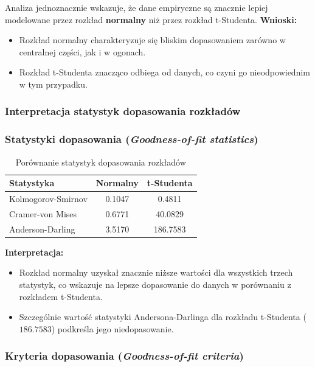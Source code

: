\documentclass[a4paper,11pt]{article}
\begin{document}
Analiza jednoznacznie wskazuje, że dane empiryczne są znacznie lepiej modelowane przez rozkład \textbf{normalny} niż przez rozkład t-Studenta.  
\textbf{Wnioski:}
\begin{itemize}
    \item Rozkład normalny charakteryzuje się bliskim dopasowaniem zarówno w centralnej części, jak i w ogonach.
    \item Rozkład t-Studenta znacząco odbiega od danych, co czyni go nieodpowiednim w tym przypadku.
\end{itemize}

\newpage\subsubsection*{Interpretacja statystyk dopasowania rozkładów}

\subsubsection*{Statystyki dopasowania (\textit{Goodness-of-fit statistics})}

\begin{table}[h!]
\centering
\begin{tabular}{|l|c|c|}
\hline
\textbf{Statystyka}            & \textbf{Normalny} & \textbf{t-Studenta} \\ \hline
Kolmogorov-Smirnov             & 0.1047            & 0.4811             \\ \hline
Cramer-von Mises               & 0.6771            & 40.0829            \\ \hline
Anderson-Darling               & 3.5170            & 186.7583           \\ \hline
\end{tabular}
\caption{Porównanie statystyk dopasowania rozkładów}
\end{table}

\textbf{Interpretacja:}
\begin{itemize}
    \item Rozkład normalny uzyskał znacznie niższe wartości dla wszystkich trzech statystyk, co wskazuje na lepsze dopasowanie do danych w porównaniu z rozkładem t-Studenta.
    \item Szczególnie wartość statystyki Andersona-Darlinga dla rozkładu t-Studenta ($186.7583$) podkreśla jego niedopasowanie.
\end{itemize}

\subsubsection*{Kryteria dopasowania (\textit{Goodness-of-fit criteria})}
\end{document}
